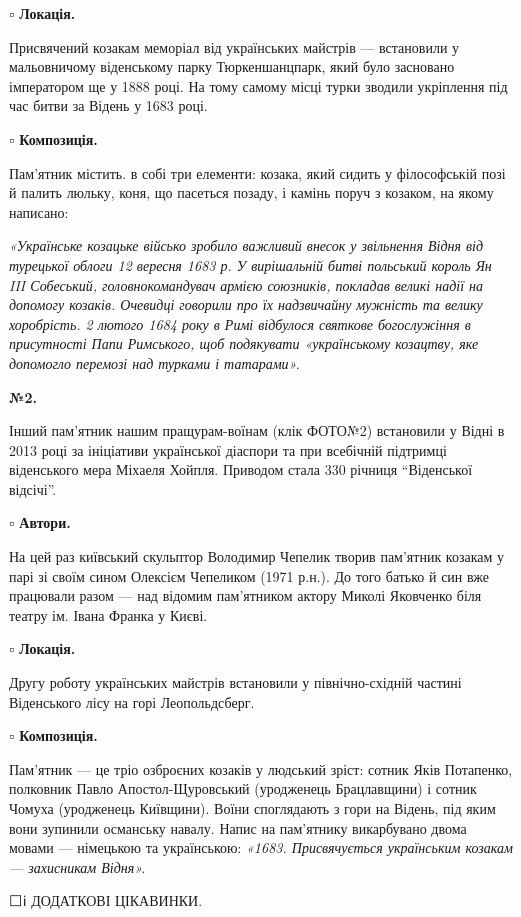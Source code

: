 \textbf{▫️ Локація.}

Присвячений козакам меморіал від українських майстрів — встановили у
мальовничому віденському парку Тюркеншанцпарк, який було засновано імператором
ще у 1888 році. На тому самому місці турки зводили укріплення під час битви за
Відень у 1683 році.

\textbf{▫️ Композиція.}

Пам'ятник містить. в собі три елементи: козака, який сидить у філософській позі
й палить люльку, коня, що пасеться позаду, і камінь поруч з козаком, на якому
написано:

\emph{«Українське козацьке військо зробило важливий внесок у звільнення Відня від
турецької облоги 12 вересня 1683 р. У вирішальній битві польський король Ян III
Собеський, головнокомандувач армією союзників, покладав великі надії на
допомогу козаків. Очевидці говорили про їх надзвичайну мужність та велику
хоробрість. 2 лютого 1684 року в Римі відбулося святкове богослужіння в
присутності Папи Римського, щоб подякувати «українському козацтву, яке
допомогло перемозі над турками і татарами».}

\textbf{№2.}

Інший пам'ятник нашим пращурам-воїнам (клік ФОТО№2) встановили у Відні в 2013
році за ініціативи української діаспори та при всебічній підтримці віденського
мера Міхаеля Хойпля. Приводом стала 330 річниця \enquote{Віденської відсічі}.

\textbf{▫️ Автори.}

На цей раз київський скульптор Володимир Чепелик творив пам'ятник козакам у
парі зі своїм сином Олексієм Чепеликом (1971 р.н.). До того батько й син вже
працювали разом — над відомим пам'ятником актору Миколі Яковченко біля театру
ім. Івана Франка у Києві.

\textbf{▫️ Локація.}

Другу роботу українських майстрів встановили у північно-східній частині
Віденського лісу на горі Леопольдсберг.

\textbf{▫️ Композиція.}

Пам'ятник — це тріо озброєних козаків у людський зріст: сотник Яків Потапенко,
полковник Павло Апостол-Щуровський (уродженець Брацлавщини) і сотник Чомуха
(уродженець Київщини). Воїни споглядають з гори на Відень, під яким вони
зупинили османську навалу. Напис на пам'ятнику викарбувано двома мовами —
німецькою та українською: \emph{«1683. Присвячується українським козакам — захисникам
Відня».}

⬜️ℹ️ ДОДАТКОВІ ЦІКАВИНКИ.

